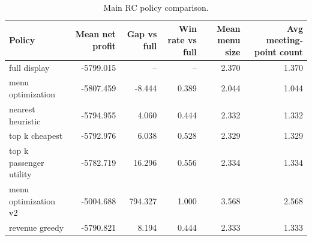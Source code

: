 \begin{table}[t]
\centering
\caption{Main RC policy comparison.}
\label{tab:rc\_main}
\begin{tabular}{lrrrrr}
\hline
Policy & Mean net profit & Gap vs full & Win rate vs full & Mean menu size & Avg meeting-point count \\
\hline
full display & -5799.015 & -- & -- & 2.370 & 1.370 \\
menu optimization & -5807.459 & -8.444 & 0.389 & 2.044 & 1.044 \\
nearest heuristic & -5794.955 & 4.060 & 0.444 & 2.332 & 1.332 \\
top k cheapest & -5792.976 & 6.038 & 0.528 & 2.329 & 1.329 \\
top k passenger utility & -5782.719 & 16.296 & 0.556 & 2.334 & 1.334 \\
menu optimization v2 & -5004.688 & 794.327 & 1.000 & 3.568 & 2.568 \\
revenue greedy & -5790.821 & 8.194 & 0.444 & 2.333 & 1.333 \\
\hline
\end{tabular}
\end{table}
